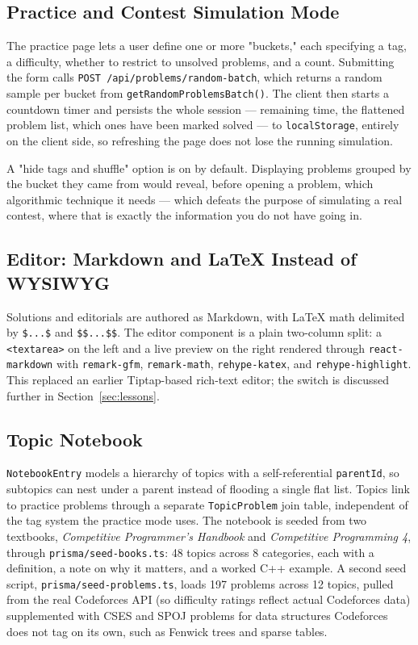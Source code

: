 \documentclass[11pt]{article}
\begin{document}
\subsection{Practice and Contest Simulation Mode}

The practice page lets a user define one or more "buckets," each specifying a tag, a difficulty, whether to restrict to unsolved problems, and a count. Submitting the form calls \texttt{POST /api/problems/random-batch}, which returns a random sample per bucket from \texttt{getRandomProblemsBatch()}. The client then starts a countdown timer and persists the whole session --- remaining time, the flattened problem list, which ones have been marked solved --- to \texttt{localStorage}, entirely on the client side, so refreshing the page does not lose the running simulation.

A "hide tags and shuffle" option is on by default. Displaying problems grouped by the bucket they came from would reveal, before opening a problem, which algorithmic technique it needs --- which defeats the purpose of simulating a real contest, where that is exactly the information you do not have going in.

\subsection{Editor: Markdown and LaTeX Instead of WYSIWYG}

Solutions and editorials are authored as Markdown, with LaTeX math delimited by \texttt{\$...\$} and \texttt{\$\$...\$\$}. The editor component is a plain two-column split: a \texttt{<textarea>} on the left and a live preview on the right rendered through \texttt{react-markdown} with \texttt{remark-gfm}, \texttt{remark-math}, \texttt{rehype-katex}, and \texttt{rehype-highlight}. This replaced an earlier Tiptap-based rich-text editor; the switch is discussed further in Section~\ref{sec:lessons}.

\subsection{Topic Notebook}

\texttt{NotebookEntry} models a hierarchy of topics with a self-referential \texttt{parentId}, so subtopics can nest under a parent instead of flooding a single flat list. Topics link to practice problems through a separate \texttt{TopicProblem} join table, independent of the tag system the practice mode uses. The notebook is seeded from two textbooks, \emph{Competitive Programmer's Handbook} and \emph{Competitive Programming 4}, through \texttt{prisma/seed-books.ts}: 48 topics across 8 categories, each with a definition, a note on why it matters, and a worked C++ example. A second seed script, \texttt{prisma/seed-problems.ts}, loads 197 problems across 12 topics, pulled from the real Codeforces API (so difficulty ratings reflect actual Codeforces data) supplemented with CSES and SPOJ problems for data structures Codeforces does not tag on its own, such as Fenwick trees and sparse tables.
\end{document}
